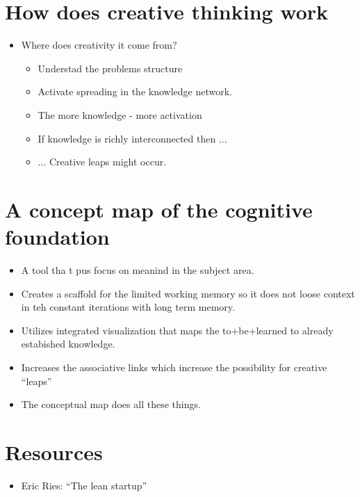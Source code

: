 \section{How does creative thinking work}
\begin{itemize}
    \item Where does creativity it come from?
    \begin{itemize}
        \item Understad the problems structure
        \item Activate spreading in the knowledge network.
        \item The more knowledge - more activation 
        \item If knowledge is richly interconnected then ...
        \item ... Creative leaps might occur.
    \end{itemize}
\end{itemize}


\section{A concept map of the cognitive foundation}
\begin{itemize}
    \item A tool tha t pus focus on meanind in the subject area.
    \item Creates a scaffold for the limited working memory so it does not loose context in teh constant iterations with long term memory.
    \item Utilizes integrated visualization that maps the to+be+learned to already estabished knowledge.
    \item Increases the associative links which increase the possibility for creative ``leaps''
    \item The conceptual map does all these things.
\end{itemize}








\section{Resources}
\begin{itemize}
    \item Eric Ries: ``The lean startup''
\end{itemize}
